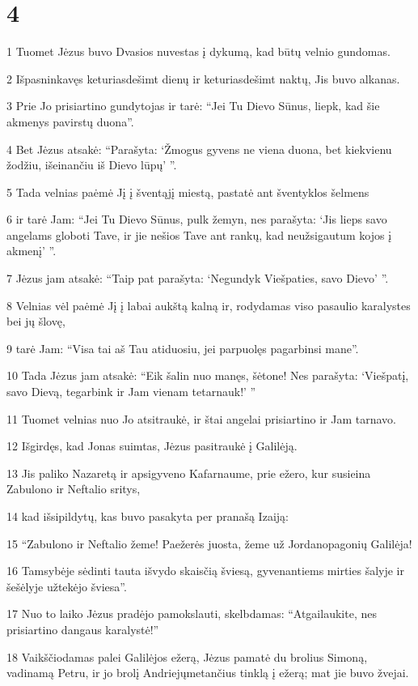 \chapter{4}


\par 1 Tuomet Jėzus buvo Dvasios nuvestas į dykumą, kad būtų velnio gundomas. 
\par 2 Išpasninkavęs keturiasdešimt dienų ir keturiasdešimt naktų, Jis buvo alkanas. 
\par 3 Prie Jo prisiartino gundytojas ir tarė: “Jei Tu Dievo Sūnus, liepk, kad šie akmenys pavirstų duona”. 
\par 4 Bet Jėzus atsakė: “Parašyta: ‘Žmogus gyvens ne viena duona, bet kiekvienu žodžiu, išeinančiu iš Dievo lūpų’ ”. 
\par 5 Tada velnias paėmė Jį į šventąjį miestą, pastatė ant šventyklos šelmens 
\par 6 ir tarė Jam: “Jei Tu Dievo Sūnus, pulk žemyn, nes parašyta: ‘Jis lieps savo angelams globoti Tave, ir jie nešios Tave ant rankų, kad neužsigautum kojos į akmenį’ ”. 
\par 7 Jėzus jam atsakė: “Taip pat parašyta: ‘Negundyk Viešpaties, savo Dievo’ ”. 
\par 8 Velnias vėl paėmė Jį į labai aukštą kalną ir, rodydamas viso pasaulio karalystes bei jų šlovę, 
\par 9 tarė Jam: “Visa tai aš Tau atiduosiu, jei parpuolęs pagarbinsi mane”. 
\par 10 Tada Jėzus jam atsakė: “Eik šalin nuo manęs, šėtone! Nes parašyta: ‘Viešpatį, savo Dievą, tegarbink ir Jam vienam tetarnauk!’ ” 
\par 11 Tuomet velnias nuo Jo atsitraukė, ir štai angelai prisiartino ir Jam tarnavo. 
\par 12 Išgirdęs, kad Jonas suimtas, Jėzus pasitraukė į Galilėją. 
\par 13 Jis paliko Nazaretą ir apsigyveno Kafarnaume, prie ežero, kur susieina Zabulono ir Neftalio sritys, 
\par 14 kad išsipildytų, kas buvo pasakyta per pranašą Izaiją: 
\par 15 “Zabulono ir Neftalio žeme! Paežerės juosta, žeme už Jordano­pagonių Galilėja! 
\par 16 Tamsybėje sėdinti tauta išvydo skaisčią šviesą, gyvenantiems mirties šalyje ir šešėlyje užtekėjo šviesa”. 
\par 17 Nuo to laiko Jėzus pradėjo pamokslauti, skelbdamas: “Atgailaukite, nes prisiartino dangaus karalystė!” 
\par 18 Vaikščiodamas palei Galilėjos ežerą, Jėzus pamatė du brolius­ Simoną, vadinamą Petru, ir jo brolį Andriejų­metančius tinklą į ežerą; mat jie buvo žvejai. 

